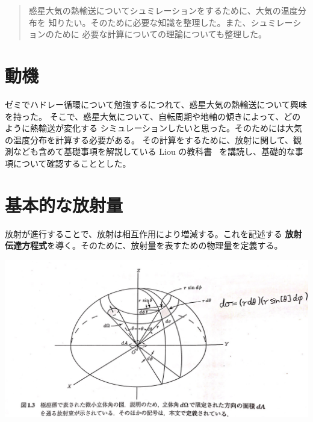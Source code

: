 \documentclass[article]{dennou777}
\renewcommand{\maketitle}{\epmaketitle}
\newcommand{\hmemph}[1]{\textbf{#1}}
\begin{document}
\begin{titlepage}
	\maketitle
\end{titlepage}

\begin{abstract}
	惑星大気の熱輸送についてシュミレーションをするために、大気の温度分布を
	知りたい。そのために必要な知識を整理した。また、シュミレーションのために
	必要な計算についての理論についても整理した。
\end{abstract}

\tableofcontents
\pagebreak

\section{動機}

ゼミでハドレー循環について勉強するにつれて、惑星大気の熱輸送について興味を持った。
そこで、惑星大気について、自転周期や地軸の傾きによって、どのように熱輸送が変化する
シミュレーションしたいと思った。そのためには大気の温度分布を計算する必要がある。
その計算をするために、放射に関して、観測なども含めて基礎事項を解説している Liou
の教科書~\cite{liou} を講読し、基礎的な事項について確認することとした。

\section{基本的な放射量}

放射が進行することで、放射は相互作用により増減する。これを記述する
\hmemph{放射伝達方程式}を導く。そのために、放射量を表すための物理量を定義する。

\includegraphics[width=\linewidth]{eq.jpg}
\end{document}
